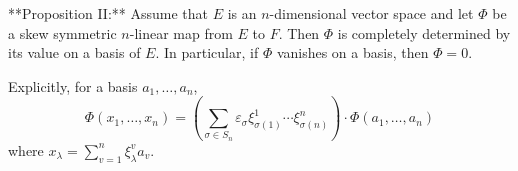 **Proposition II:** Assume that $E$ is an $n$-dimensional vector space and let $\Phi$ be a skew symmetric $n$-linear map from $E$ to $F$. Then $\Phi$ is completely determined by its value on a basis of $E$. In particular, if $\Phi$ vanishes on a basis, then $\Phi = 0$.

Explicitly, for a basis $a_1, \ldots, a_n$,
$$\Phi(x_1, \ldots, x_n) = \left( \sum_{\sigma \in S_n} \varepsilon_\sigma \xi_{\sigma(1)}^1 \cdots \xi_{\sigma(n)}^n \right) \cdot \Phi(a_1, \ldots, a_n)$$
where $x_\lambda = \sum_{v=1}^n \xi_\lambda^v a_v$.

